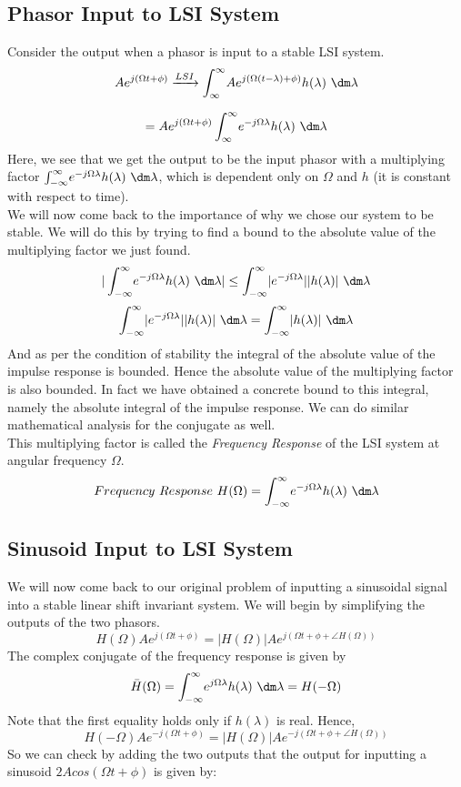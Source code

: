 \subsection{Phasor Input to LSI System}
Consider the output when a phasor is input to a stable LSI system.
\[
Ae^{j(\Omega t + \phi)} \xrightarrow{LSI} 
 \int_{\infty}^{\infty} \! Ae^{j(\Omega (t - \lambda) + \phi)}h(\lambda) \ \dm \lambda
\]
 
\[ =
Ae^{j(\Omega t + \phi)} \int_{\infty}^{\infty} \! {e^{-j\Omega\lambda}h(\lambda) \ \dm \lambda}
\]
Here, we see that we get the output to be the input phasor with a multiplying factor $\int_{-\infty}^{\infty} \! {e^{-j\Omega\lambda}h(\lambda) \ \dm \lambda}$, which is dependent only on $\Omega$ and $h$ (it is constant with respect to time).\\
We will now come back to the importance of why we chose our system to be stable. We will do this by trying to find a bound to the absolute value of the multiplying factor we just found.
\[
| \int_{-\infty}^{\infty} \! {e^{-j\Omega\lambda}h(\lambda) \ \dm \lambda} | \leq 
\int_{-\infty}^{\infty} \! { |e^{-j\Omega\lambda}||h(\lambda)| \ \dm \lambda }
\]
\[
\int_{-\infty}^{\infty} \! { |e^{-j\Omega\lambda}||h(\lambda)| \ \dm \lambda } =
\int_{-\infty}^{\infty} \! {|h(\lambda)| \ \dm \lambda }
\]
And as per the condition of stability the integral of the absolute value of the impulse response is bounded. Hence the absolute value of the multiplying factor is also bounded. In fact we have obtained a concrete bound to this integral, namely the absolute integral of the impulse response. We can do similar mathematical analysis for the conjugate as well.\\
This multiplying factor is called the \textit{Frequency Response} of the LSI system at angular frequency $\Omega$.
\[
	Frequency\ Response\ H(\Omega) = \int_{-\infty}^{\infty} \! {e^{-j\Omega\lambda}h(\lambda) \ \dm \lambda}
\] 
\subsection{Sinusoid Input to LSI System}
We will now come back to our original problem of inputting a sinusoidal signal into a stable linear shift invariant system. We will begin by simplifying the outputs of the two phasors.
\[
	H(\Omega)Ae^{j(\Omega t + \phi)} = |H(\Omega)|Ae^{j(\Omega t + \phi +  \angle  H(\Omega))}
\]
The complex conjugate of the frequency response is given by
\[
\bar{H}(\Omega) = \int_{-\infty}^{\infty} \! {e^{j\Omega\lambda}h(\lambda) \ \dm \lambda} = H(-\Omega)
\]
Note that the first equality holds only if $h(\lambda)$ is real.
Hence,
\[
H(-\Omega)Ae^{-j(\Omega t + \phi)} = |H(\Omega)|Ae^{-j(\Omega t + \phi +  \angle  H(\Omega))}
\]
So we can check by adding the two outputs that the output for inputting a sinusoid $2Acos(\Omega t + \phi)$ is given by:

